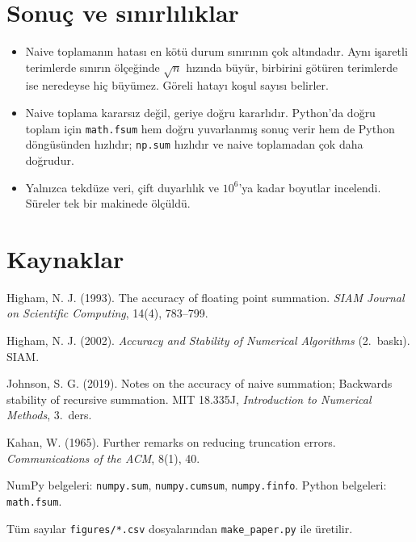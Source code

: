 \documentclass[11pt,a4paper]{article}
\begin{document}
\section{Sonuç ve sınırlılıklar}

\begin{itemize}
  \item Naive toplamanın hatası en kötü durum sınırının çok altındadır. Aynı işaretli terimlerde sınırın ölçeğinde $\sqrt{n}$
  hızında büyür, birbirini götüren terimlerde ise neredeyse hiç büyümez. Göreli hatayı koşul sayısı belirler.
  \item Naive toplama kararsız değil, geriye doğru kararlıdır. Python'da doğru toplam için \texttt{math.fsum} hem doğru
  yuvarlanmış sonuç verir hem de Python döngüsünden hızlıdır; \texttt{np.sum} hızlıdır ve naive toplamadan çok daha doğrudur.
  \item Yalnızca tekdüze veri, çift duyarlılık ve $10^6$'ya kadar boyutlar incelendi. Süreler tek bir makinede ölçüldü.
\end{itemize}

\section*{Kaynaklar}
{\small
\setlength{\parskip}{2pt}
\hangindent=1.27cm Higham, N. J. (1993). The accuracy of floating point summation. \textit{SIAM Journal on Scientific Computing}, 14(4), 783--799.\par
\hangindent=1.27cm Higham, N. J. (2002). \textit{Accuracy and Stability of Numerical Algorithms} (2.\ baskı). SIAM.\par
\hangindent=1.27cm Johnson, S. G. (2019). Notes on the accuracy of naive summation; Backwards stability of recursive summation.
MIT 18.335J, \textit{Introduction to Numerical Methods}, 3.\ ders.\par
\hangindent=1.27cm Kahan, W. (1965). Further remarks on reducing truncation errors. \textit{Communications of the ACM}, 8(1), 40.\par
\hangindent=1.27cm NumPy belgeleri: \texttt{numpy.sum}, \texttt{numpy.cumsum}, \texttt{numpy.finfo}. Python belgeleri: \texttt{math.fsum}.\par

\smallskip
Tüm sayılar
\texttt{figures/*.csv} dosyalarından \texttt{make\_paper.py} ile üretilir.
}
\end{document}
